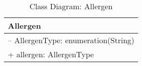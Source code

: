 \begin{table}[H]
\centering
\caption{Class Diagram: Allergen}

\hspace{1em}
\renewcommand{\arraystretch}{1.7}

\begin{tabular}{|l|}
\hline
\textbf{Allergen} \\
\hline
– AllergenType: enumeration(String) \\
+ allergen: AllergenType \\
\hline
\end{tabular}
\end{table}
